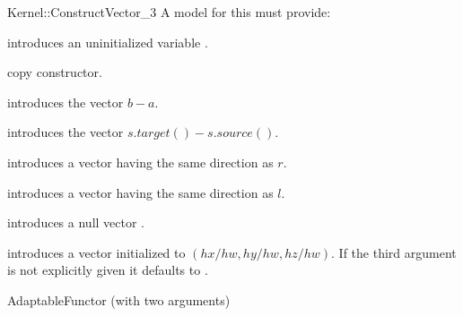 \begin{ccRefFunctionObjectConcept}{Kernel::ConstructVector_3}
A model for this must provide:



\ccHidden{}
             {introduces an uninitialized variable .}

\ccHidden {}
            {copy constructor.}

            {introduces the vector $b-a$.}

            {introduces the vector $s.target()-s.source()$.}

            {introduces a vector having the same direction as $r$.}

            {introduces a vector having the same direction as $l$.}

            {introduces a null vector .}

\ccHidden{}
            {introduces a vector  initialized to $(hx/hw, hy/hw, hz/hw)$.
             If the third argument is not explicitly given it defaults
             to .}

\ccRefines
AdaptableFunctor (with two arguments)

\ccSeeAlso
{}\\

\end{ccRefFunctionObjectConcept}
